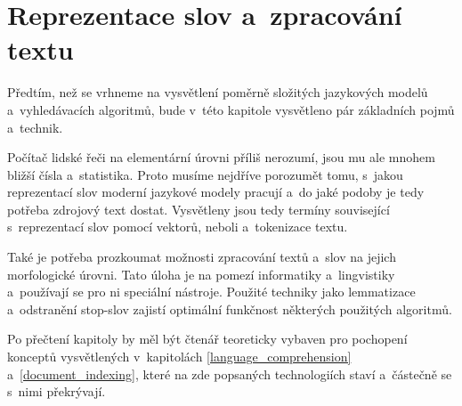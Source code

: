 
\chapter{Reprezentace slov a~zpracování textu}
\label{text_processing}

Předtím, než se vrhneme na vysvětlení poměrně složitých jazykových modelů a~vyhledávacích algoritmů, bude v~této kapitole vysvětleno pár základních pojmů a~technik.\par 
Počítač lidské řeči na elementární úrovni příliš nerozumí, jsou mu ale mnohem bližší čísla a~statistika. Proto musíme nejdříve porozumět tomu, s~jakou reprezentací slov moderní jazykové modely pracují a~do jaké podoby je tedy potřeba zdrojový text dostat. Vysvětleny jsou tedy termíny související s~reprezentací slov pomocí vektorů, neboli  a~tokenizace textu.\par 
Také je potřeba prozkoumat možnosti zpracování textů a~slov na jejich morfologické úrovni. Tato úloha je na pomezí informatiky a~lingvistiky a~používají se pro ni speciální nástroje. Použité techniky jako lemmatizace a~odstranění stop-slov zajistí optimální funkčnost některých použitých algoritmů.\par
Po přečtení kapitoly by měl být čtenář teoreticky vybaven pro pochopení konceptů vysvětlených v~kapitolách \ref{language_comprehension} a~\ref{document_indexing}, které na zde popsaných technologiích staví a~částečně se s~nimi překrývají.

